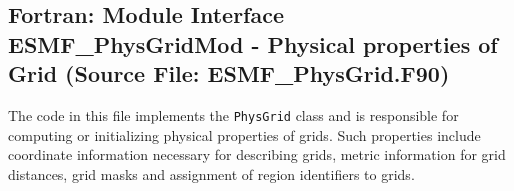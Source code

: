  
\parskip        0pt
\parindent      0pt
\baselineskip  11pt
 
\def\bv{\begin{verbatim}}
\def\ev{\end{verbatim}}
\def\be{\begin{equation}}
\def\ee{\end{equation}}
\def\bea{\begin{eqnarray}}
\def\eea{\end{eqnarray}}
\def\bi{\begin{itemize}}
\def\ei{\end{itemize}}
\def\bn{\begin{enumerate}}
\def\en{\end{enumerate}}
\def\bd{\begin{description}}
\def\ed{\end{description}}
\def\({\left (}
\def\){\right )}
\def\[{\left [}
\def\]{\right ]}
\def\<{\left  \langle}
\def\>{\right \rangle}
\def\cI{{\cal I}}
\def\diag{\mathop{\rm diag}}
\def\tr{\mathop{\rm tr}}


 
\subsection{Fortran:  Module Interface ESMF\_PhysGridMod - Physical properties of Grid (Source File: ESMF\_PhysGrid.F90)}


  
  
   The code in this file implements the {\tt PhysGrid} class and is responsible
   for computing or initializing physical properties of grids.   Such
   properties include coordinate information necessary for describing grids,
   metric information for grid distances, grid masks and assignment of
   region identifiers to grids.
  
